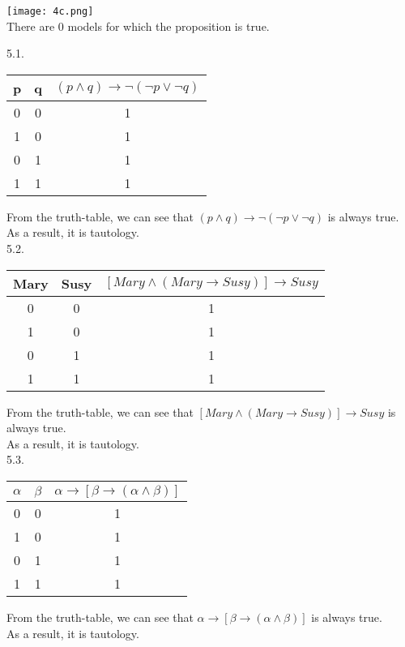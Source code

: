 \documentclass[a4paper]{article}
\begin{document}
\texttt{[image: 4c.png]}\\
There are 0 models for which the proposition is true.

5.1.\\
\begin{table}[!htb]
\centering
\begin{tabular}{|c|c|c|}
\hline
p & q & $(p \wedge q) \rightarrow \neg(\neg p \vee \neg q)$ \\ \hline
0 & 0 & 1 \\ \hline
1 & 0 & 1 \\ \hline
0 & 1 & 1 \\ \hline
1 & 1 & 1 \\ \hline
\end{tabular}
\end{table}
From the truth-table, we can see that $(p \wedge q) \rightarrow \neg(\neg p \vee \neg q)$ is always true. \\
As a result, it is tautology.\\

5.2.\\
\begin{table}[!htb]
\centering
\begin{tabular}{|c|c|c|}
\hline
Mary & Susy & $[Mary \wedge (Mary \rightarrow Susy)] \rightarrow Susy$ \\ \hline
0 & 0 & 1 \\ \hline
1 & 0 & 1 \\ \hline
0 & 1 & 1 \\ \hline
1 & 1 & 1 \\ \hline
\end{tabular}
\end{table}
From the truth-table, we can see that $[Mary \wedge (Mary \rightarrow Susy)] \rightarrow Susy$ is always true. \\
As a result, it is tautology.\\

5.3.\\
\begin{table}[!htb]
\centering
\begin{tabular}{|c|c|c|}
\hline
$\alpha$ & $\beta$ & $\alpha \rightarrow [\beta \rightarrow (\alpha \wedge \beta)]$ \\ \hline
0 & 0 & 1 \\ \hline
1 & 0 & 1 \\ \hline
0 & 1 & 1 \\ \hline
1 & 1 & 1 \\ \hline
\end{tabular}
\end{table}
From the truth-table, we can see that $\alpha \rightarrow [\beta \rightarrow (\alpha \wedge \beta)]$ is always true. \\
As a result, it is tautology.\\
\end{document}
